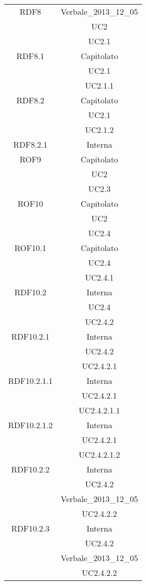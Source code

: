 \begin{longtable}{|c|c|}
\midrule
RDF8
& Verbale\_2013\_12\_05\\
& UC2\\
& UC2.1\\

\midrule
RDF8.1
& Capitolato\\
& UC2.1\\
& UC2.1.1\\

\midrule
RDF8.2
& Capitolato\\
& UC2.1\\
& UC2.1.2\\

\midrule
RDF8.2.1
& Interna\\

\midrule
ROF9
& Capitolato\\
& UC2\\
& UC2.3\\

\midrule
ROF10
& Capitolato\\
& UC2\\
& UC2.4\\

\midrule
ROF10.1
& Capitolato\\
& UC2.4\\
& UC2.4.1\\

\midrule
RDF10.2
& Interna\\
& UC2.4\\
& UC2.4.2\\

\midrule
RDF10.2.1
& Interna\\
& UC2.4.2\\
& UC2.4.2.1\\

\midrule
RDF10.2.1.1
& Interna\\
& UC2.4.2.1\\
& UC2.4.2.1.1
\\

\midrule
RDF10.2.1.2
& Interna\\
& UC2.4.2.1\\
& UC2.4.2.1.2
\\

\midrule
RDF10.2.2
& Interna\\
& UC2.4.2\\
& Verbale\_2013\_12\_05\\
& UC2.4.2.2
\\

\midrule
RDF10.2.3
& Interna\\
& UC2.4.2\\
& Verbale\_2013\_12\_05\\
& UC2.4.2.2
\\


\end{longtable}
